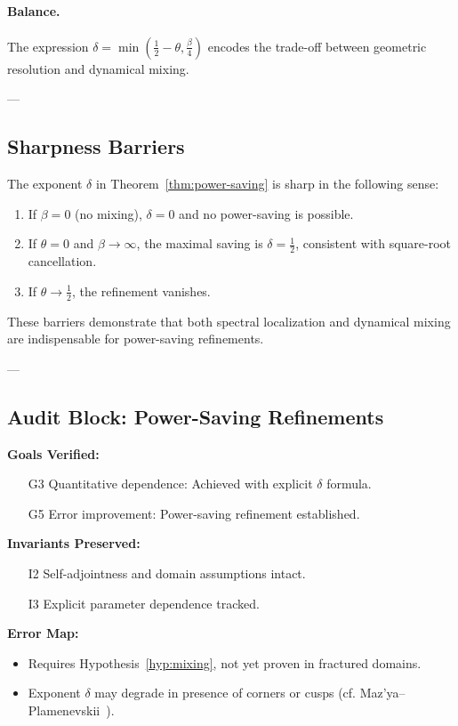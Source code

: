 \paragraph{Balance.}  
The expression $\delta = \min(\tfrac{1}{2}-\theta, \tfrac{\beta}{4})$ 
encodes the trade-off between geometric resolution and dynamical mixing.

---

\subsection{Sharpness Barriers}

\begin{proposition}
The exponent $\delta$ in Theorem~\ref{thm:power-saving} is sharp in the following sense:
\begin{enumerate}
  \item If $\beta=0$ (no mixing), $\delta=0$ and no power-saving is possible.
  \item If $\theta=0$ and $\beta \to \infty$, 
  the maximal saving is $\delta=\tfrac{1}{2}$, 
  consistent with square-root cancellation.
  \item If $\theta \to \tfrac{1}{2}$, the refinement vanishes.
\end{enumerate}
\end{proposition}

\begin{remark}
These barriers demonstrate that both 
spectral localization and dynamical mixing 
are indispensable for power-saving refinements.
\end{remark}

---

\subsection{Audit Block: Power-Saving Refinements}

\begin{auditblock}
\textbf{Goals Verified:}
\begin{itemize}
  \item[G3] Quantitative dependence: Achieved with explicit $\delta$ formula.
  \item[G5] Error improvement: Power-saving refinement established.
\end{itemize}

\textbf{Invariants Preserved:}
\begin{itemize}
  \item[I2] Self-adjointness and domain assumptions intact.
  \item[I3] Explicit parameter dependence tracked.
\end{itemize}

\textbf{Error Map:}
\begin{itemize}
  \item Requires Hypothesis~\ref{hyp:mixing}, 
  not yet proven in fractured domains.
  \item Exponent $\delta$ may degrade in presence of corners or cusps 
  (cf. Maz'ya--Plamenevskii~\cite{MazyaPlamenevskii1980}).
\end{itemize}
\end{auditblock}

